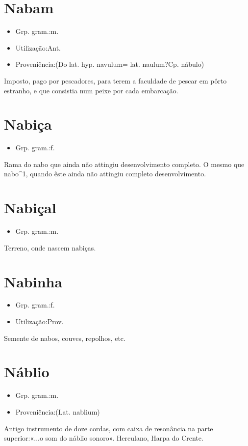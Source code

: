 \section{Nabam}
\begin{itemize}
\item {Grp. gram.:m.}
\end{itemize}
\begin{itemize}
\item {Utilização:Ant.}
\end{itemize}
\begin{itemize}
\item {Proveniência:(Do lat. hyp. \textunderscore navulum\textunderscore  = lat. \textunderscore naulum?\textunderscore  Cp. \textunderscore nábulo\textunderscore )}
\end{itemize}
Imposto, pago por pescadores, para terem a faculdade de pescar em pôrto estranho, e que consistia num peixe por cada embarcação.
\section{Nabiça}
\begin{itemize}
\item {Grp. gram.:f.}
\end{itemize}
Rama do nabo que ainda não attingiu desenvolvimento completo.
O mesmo que \textunderscore nabo\textunderscore ^1, quando êste ainda não attingiu completo desenvolvimento.
\section{Nabiçal}
\begin{itemize}
\item {Grp. gram.:m.}
\end{itemize}
Terreno, onde nascem nabiças.
\section{Nabinha}
\begin{itemize}
\item {Grp. gram.:f.}
\end{itemize}
\begin{itemize}
\item {Utilização:Prov.}
\end{itemize}
Semente de nabos, couves, repolhos, etc.
\section{Náblio}
\begin{itemize}
\item {Grp. gram.:m.}
\end{itemize}
\begin{itemize}
\item {Proveniência:(Lat. \textunderscore nablium\textunderscore )}
\end{itemize}
Antigo instrumento de doze cordas, com caixa de resonância na parte superior:«\textunderscore ...o som do náblio sonoro\textunderscore ». Herculano, \textunderscore Harpa do Crente\textunderscore .
